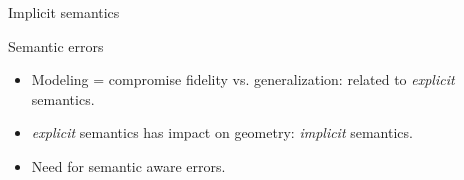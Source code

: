 \documentclass[10pt]{beamer}
\begin{document}
        \begin{frame}{Implicit semantics}
            \begin{figure}[H]
                \begin{center}
                \end{center}
            \end{figure}
        \end{frame}

        \begin{frame}{Semantic errors}
            \begin{itemize}
                \item<1-> Modeling = compromise fidelity vs. generalization: related to \textit{explicit} semantics.
                \item<2-> \textit{explicit} semantics has impact on geometry: \textit{implicit} semantics.
                \item<3-> Need for semantic aware errors.
            \end{itemize}
        \end{frame}
\end{document}

